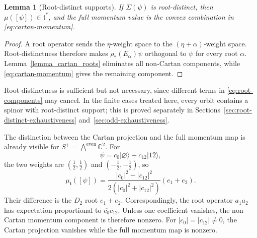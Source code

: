 \documentclass{article}
\newtheorem{lemma}[theorem]{Lemma}
\theoremstyle{definition}
\theoremstyle{remark}
\newcommand{\C}{\mathbb C}
\newcommand{\ket}[1]{\lvert #1\rangle}
\begin{document}
\medskip

\begin{lemma}[Root-distinct supports]
\label{lemma_root_distinct_support}
If $\Sigma(\psi)$ is root-distinct, then
$\mu([\psi])\in\mathfrak t^*$, and the full momentum value is the convex
combination in \eqref{eq:cartan-momentum}.
\end{lemma}

\begin{proof}
A root operator sends the $\eta$-weight space to the
$(\eta+\alpha)$-weight space.  Root-distinctness therefore makes
$\rho_*(E_\alpha)\psi$ orthogonal to $\psi$ for every root $\alpha$.
Lemma~\ref{lemma_cartan_roots} eliminates all non-Cartan components, while
\eqref{eq:cartan-momentum} gives the remaining component.
\end{proof}

\medskip

Root-distinctness is sufficient but not necessary, since different terms
in \eqref{eq:root-components} may cancel. In the finite cases treated here,
every orbit contains a spinor with root-distinct support; this is proved separately in
Sections~\ref{sec:root-distinct-exhaustiveness}
and~\ref{sec:odd-exhaustiveness}.

The distinction between the Cartan projection and the full momentum map is
already visible for $S^+=\bigwedge^{\mathrm{even}}\C^2$.  For
\begin{equation*}
 \psi=c_0\ket\varnothing+c_{12}\ket{12},
\end{equation*}
the two weights are $(\frac12,\frac12)$ and
$(-\frac12,-\frac12)$, so
\begin{equation*}
 \mu_{\mathfrak t}([\psi])
 =\frac{|c_0|^2-|c_{12}|^2}
        {2(|c_0|^2+|c_{12}|^2)}(e_1+e_2).
\end{equation*}
Their difference is the $D_2$ root $e_1+e_2$.  Correspondingly, the root
operator $a_1a_2$ has expectation proportional to
$\overline{c_0}c_{12}$.  Unless one coefficient vanishes, the non-Cartan
momentum component is therefore nonzero.  For $|c_0|=|c_{12}|\ne0$, the Cartan projection vanishes while the full
momentum map is nonzero.
\end{document}
